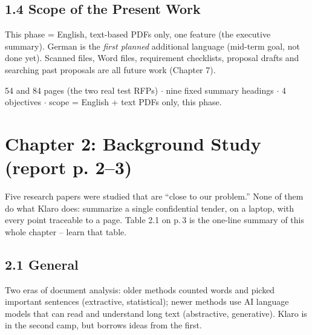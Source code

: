 \documentclass[11pt,a4paper]{article}
\begin{document}
\subsection*{1.4 Scope of the Present Work}
This phase = English, text-based PDFs only, one feature (the executive summary). German is the
\emph{first planned} additional language (mid-term goal, not done yet). Scanned files, Word files,
requirement checklists, proposal drafts and searching past proposals are all future work (Chapter 7).

\begin{keynums}
54 and 84 pages (the two real test RFPs) $\cdot$ nine fixed summary headings $\cdot$ 4 objectives
$\cdot$ scope = English + text PDFs only, this phase.
\end{keynums}

\newpage
\section{Chapter 2: Background Study (report p. 2--3)}

\begin{bigpicture}
Five research papers were studied that are ``close to our problem.'' None of them do what Klaro
does: summarize a single confidential tender, on a laptop, with every point traceable to a page.
Table 2.1 on p.\,3 is the one-line summary of this whole chapter -- learn that table.
\end{bigpicture}

\subsection*{2.1 General}
Two eras of document analysis: older methods counted words and picked important sentences (extractive,
statistical); newer methods use AI language models that can read and understand long text
(abstractive, generative). Klaro is in the second camp, but borrows ideas from the first.
\end{document}
